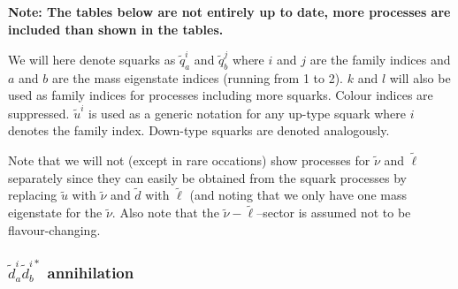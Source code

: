 {\bfseries Note: The tables below are not entirely up to date, more processes are included
than shown in the tables.}

\smallskip

We will here denote squarks as $\tilde{q}^i_a$ and $\tilde{q}^j_b$ where $i$ and
$j$ are the family indices and $a$ and $b$ are the mass eigenstate indices
(running from 1 to 2). $k$ and $l$ will also be used as family indices for processes including more squarks. Colour indices are suppressed. $\tilde{u}^i$ is used as a
generic notation for any up-type squark where $i$ denotes the family index. Down-type 
squarks are denoted analogously.

Note that we will not (except in rare occations) show processes for $\tilde{\nu}$
and $\tilde{\ell}$ separately since they can easily be obtained from the squark
processes by replacing $\tilde{u}$ with $\tilde{\nu}$ and 
$\tilde{d}$ with $\tilde{\ell}$ (and noting that we only have one mass eigenstate
for the $\tilde{\nu}$. Also note that the $\tilde{\nu}-\tilde{\ell}$--sector
is assumed not to be flavour-changing.

\subsubsection{$\tilde{d}^i_{a}\tilde{d}_{b}^{i*}$ annihilation}

